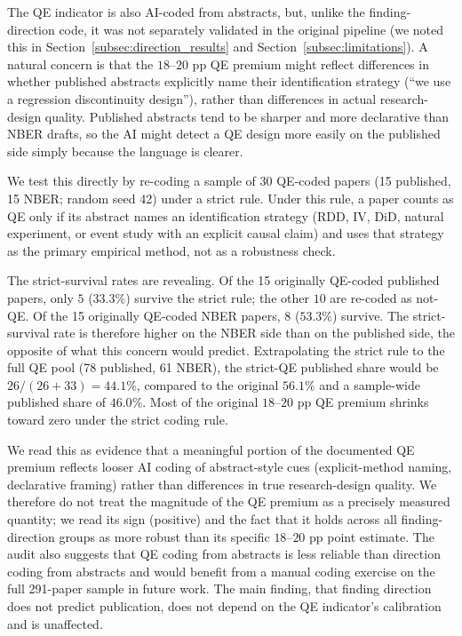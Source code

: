 \documentclass[12pt]{article}
\begin{document}
The QE indicator is also AI-coded from abstracts, but, unlike the
finding-direction code, it was not separately validated in the
original pipeline (we noted this in
Section~\ref{subsec:direction_results} and
Section~\ref{subsec:limitations}).  A natural concern is that the
$18$--$20$ pp QE premium might reflect differences in whether
published abstracts explicitly name their
identification strategy (``we use a regression discontinuity
design''), rather than differences in actual research-design quality.
Published abstracts tend to be sharper and more declarative than NBER
drafts, so the AI might detect a QE design more easily on the
published side simply because the language is clearer.

We test this directly by re-coding a sample of 30 QE-coded papers
(15 published, 15 NBER; random seed 42) under a strict rule.  Under
this rule, a paper counts as QE only if its abstract names an
identification strategy (RDD, IV, DiD, natural experiment, or event
study with an explicit causal claim) and uses that strategy as the
primary empirical method, not as a robustness check.

The strict-survival rates are revealing.  Of the 15 originally
QE-coded published papers, only $5$ ($33.3\%$) survive the strict
rule; the other $10$ are re-coded as not-QE.  Of the 15 originally
QE-coded NBER papers, $8$ ($53.3\%$) survive.  The strict-survival
rate is therefore higher on the NBER side than on the
published side, the opposite of what this concern would predict.  Extrapolating the strict rule to the full QE pool (78
published, 61 NBER), the strict-QE published share would be
$26 / (26 + 33) = 44.1\%$, compared to the original $56.1\%$ and a
sample-wide published share of $46.0\%$.  Most of the original
$18$--$20$ pp QE premium shrinks toward zero under the strict coding
rule.

We read this as evidence that a meaningful portion of the documented
QE premium reflects looser AI coding of abstract-style cues
(explicit-method naming, declarative framing) rather than differences
in true research-design quality.  We therefore do not treat the
magnitude of the QE premium as a precisely measured quantity; we read
its sign (positive) and the fact that it holds across all
finding-direction groups as more robust than its specific
$18$--$20$ pp point estimate.  The audit also suggests that QE coding
from abstracts is less reliable than direction coding from abstracts
and would benefit from a manual coding exercise on the full
291-paper sample in future work.  The main finding, that finding
direction does not predict publication, does not depend on the QE
indicator's calibration and is unaffected.
\end{document}
